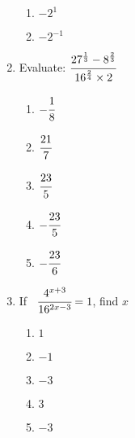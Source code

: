 \begin{multicols}{2}
\begin{enumerate}[label={\arabic*.}]
\begin{enumerate}[label={\Alph*.}]
	\item \(-2^1\)
	\item \(-2^{-1}\)
	\end{enumerate}
\item Evaluate: $\cfrac{27^{\frac{1}{3}} - 8^{\frac{2}{3}}}{16^{\frac{2}{4}} \times 2}$ 
\begin{multicols}{3}
	\begin{enumerate}[label={\Alph*.}]
	\item \(-\cfrac{1}{8}\)
	\item \(\cfrac{21}{7}\)
	\item \(\cfrac{23}{5}\)
	\item \(-\cfrac{23}{5}\)
	\item \(-\cfrac{23}{6}\)
	\end{enumerate}
\end{multicols}
\item If \, $\cfrac{4^{x+3}}{16^{2x -3}} = 1$, find $x$
\begin{multicols}{3}
	\begin{enumerate}[label={\Alph*.}]
	\item \(1\)
	\item \(-1\)
	\item \(-3\)
	\item \(3\)
	\item \(-3\)
	\end{enumerate}
\end{multicols}



\end{enumerate}
\end{multicols}
